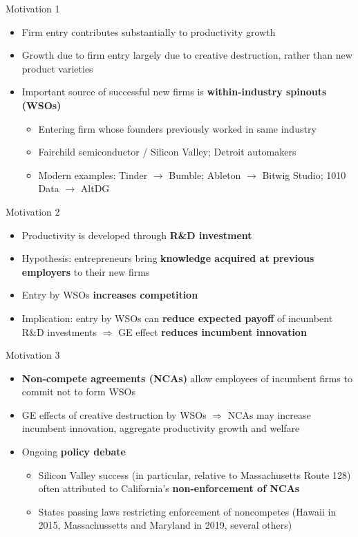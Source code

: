 \documentclass[english,usenames,dvipsnames]{beamer}
\begin{document}
\begin{frame}{Motivation 1}
\begin{itemize}
	\item Firm entry contributes substantially to productivity growth
	\item Growth due to firm entry largely due to creative destruction, rather than new product varieties
	\item Important source of successful new firms is \alert{\textbf{within-industry spinouts (WSOs)}}
	\begin{itemize}
		\item Entering firm whose founders previously worked in same industry 
		\hyperlink{spinouts_facts_from_literature}{}
		\item Fairchild semiconductor / Silicon Valley; Detroit automakers \hyperlink{fairchildren_early}{}
		\item Modern examples: Tinder $\rightarrow$ Bumble; Ableton $\rightarrow$ Bitwig Studio; 1010 Data $\rightarrow$ AltDG 
	\end{itemize}
\end{itemize}
\end{frame}

\begin{frame}{Motivation 2}
\begin{itemize}
	\item Productivity is developed through \alert{\textbf{R\&D investment}}
	\item Hypothesis: entrepreneurs bring \alert{\textbf{\textbf{knowledge acquired at previous employers}}} to their new firms
	\item Entry by WSOs \alert{\textbf{increases competition}}
	\item Implication: entry by WSOs can \alert{\textbf{reduce expected payoff}} of incumbent R\&D investments $\Rightarrow$ GE effect \alert{\textbf{reduces incumbent innovation}}
\end{itemize}
\end{frame}

\begin{frame}{Motivation 3}
\begin{itemize}
	\item \alert{\textbf{Non-compete agreements (NCAs)}} allow employees of incumbent firms to commit not to form WSOs
	\item GE effects of creative destruction by WSOs $\Rightarrow$ NCAs may increase incumbent innovation, aggregate productivity growth and welfare
	\item Ongoing \alert{\textbf{policy debate}}
	\begin{itemize}
		\item Silicon Valley success (in particular, relative to Massachusetts Route 128) often attributed to California's \alert{\textbf{non-enforcement of NCAs}}
		\item States passing laws restricting enforcement of noncompetes (Hawaii in 2015, Massachussetts and Maryland in 2019, several others)
	\end{itemize}
\end{itemize}
\end{frame}
\end{document}
